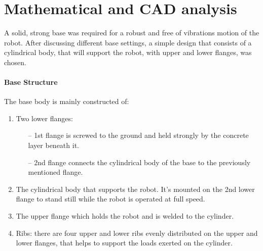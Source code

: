 
%
		\section{Mathematical and CAD analysis}
A solid, strong base was required for a robust and free of vibrations motion of the robot. After discussing different base settings, a simple design that consists of a cylindrical body, that will support the robot, with upper and lower flanges, was chosen.
\vspace{0.5 cm}
\paragraph{Base Structure}
The base body is mainly constructed of:
\begin{enumerate}
\item Two lower flanges:
	\begin{itemize}
	\item[--] 1st flange is screwed to the ground and held strongly by the concrete layer beneath it.
	\item[--] 2nd flange connects the cylindrical body of the base to the previously mentioned flange.
	\end{itemize}

\item The cylindrical body that supports the robot. It’s mounted on the 2nd lower flange to stand still while the robot is operated at full speed.

\item The upper flange which holds the robot and is welded to the cylinder.

\item Ribs: there are four upper and lower ribs evenly distributed on the upper and lower flanges, that helps to support the loads exerted on the cylinder.
\end{enumerate}

